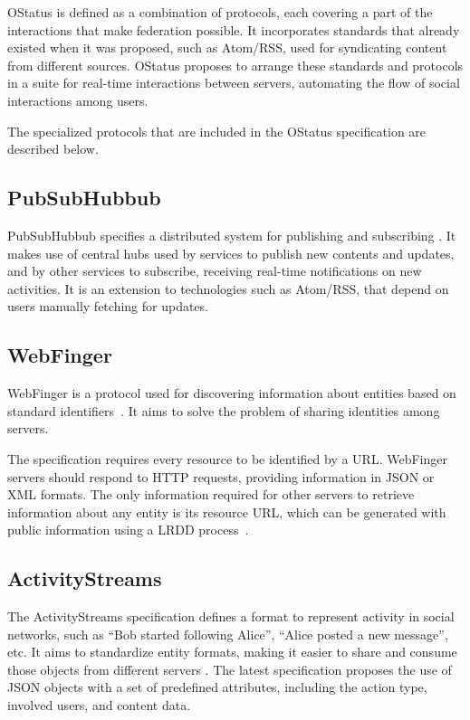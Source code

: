 OStatus is defined as a combination of protocols, each covering a part
of the interactions that make federation possible. It incorporates
standards that already existed when it was proposed, such as Atom/RSS,
used for syndicating content from different sources.  OStatus proposes
to arrange these standards and protocols in a suite for real-time
interactions between servers, automating the flow of social interactions
among users.

The specialized protocols that are included in the OStatus specification
are described below.


\subsection{PubSubHubbub}

PubSubHubbub specifies a distributed system for publishing and
subscribing \cite{pubsub2014}. It makes use of central hubs used by services
to publish new contents and updates, and by other services to subscribe,
receiving real-time notifications on new activities. It is an extension to
technologies such as Atom/RSS, that depend on users manually fetching
for updates.

\subsection{WebFinger}

WebFinger is a protocol used for discovering information about entities
based on standard identifiers~\cite{rfc7033}. It aims to solve the problem
of sharing identities among servers.

The specification requires every resource to be identified by a URL.
WebFinger servers should respond to HTTP requests, providing information
in JSON or XML formats. The only information required for other servers
to retrieve information about any entity is its resource URL, which can
be generated with public information using a LRDD process~\cite{lrdd2010}.

\subsection{ActivityStreams}

The ActivityStreams specification defines a format to represent activity
in social networks, such as ``Bob started following Alice'', ``Alice
posted a new message'', etc. It aims to standardize entity formats,
making it easier to share and consume those objects from different
servers \cite{actstreams2011}. The latest specification proposes the use of
JSON objects with a set of predefined attributes, including the action type,
involved users, and content data.

